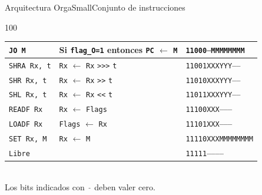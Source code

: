 \documentclass[aspectratio=169]{beamer}
\begin{document}
\begin{frame}[fragile,t]{Arquitectura OrgaSmall}{Conjunto de instrucciones}
\begin{textblock}{100}
\begin{tabular}{l|l|l}
    \texttt{JO M}          & Si \texttt{flag\_O=1} entonces \texttt{PC} $\leftarrow$ \texttt{M} & \texttt{\textcolor{r}{11000}\textcolor{gray}{---}\textcolor{a}{MMMMMMMM}} \\  %
    \hline
    \texttt{SHRA Rx, t}    & \texttt{Rx} $\leftarrow$ \texttt{Rx} \verb|>>>| \texttt{t}         & \texttt{\textcolor{r}{11001}\textcolor{v}{XXX}\textcolor{verde}{YYY}\textcolor{gray}{-----}} \\  %
    \texttt{SHR Rx, t}     & \texttt{Rx} $\leftarrow$ \texttt{Rx} \verb|>>| \texttt{t}          & \texttt{\textcolor{r}{11010}\textcolor{v}{XXX}\textcolor{verde}{YYY}\textcolor{gray}{-----}} \\  %
    \texttt{SHL Rx, t}     & \texttt{Rx} $\leftarrow$ \texttt{Rx} \verb|<<| \texttt{t}          & \texttt{\textcolor{r}{11011}\textcolor{v}{XXX}\textcolor{verde}{YYY}\textcolor{gray}{-----}} \\  %
    \hline
    \texttt{READF Rx}      & \texttt{Rx}    $\leftarrow$ \texttt{Flags}                         & \texttt{\textcolor{r}{11100}\textcolor{v}{XXX}\textcolor{gray}{--------}} \\  %
    \texttt{LOADF Rx}      & \texttt{Flags} $\leftarrow$ \texttt{Rx}                            & \texttt{\textcolor{r}{11101}\textcolor{v}{XXX}\textcolor{gray}{--------}} \\  %
    \hline
    \texttt{SET Rx, M}     & \texttt{Rx} $\leftarrow$ \texttt{M}                                & \texttt{\textcolor{r}{11110}\textcolor{v}{XXX}\textcolor{a}{MMMMMMMM}} \\  %
    \hline
    \texttt{Libre}         &                                                                    & \texttt{\textcolor{r}{11111}\textcolor{gray}{-----------}} \\  %
    \end{tabular}\\
    \vspace{0.2cm}
    Los bits indicados con \textcolor{gray}{\texttt{-}} deben valer cero.
    \end{textblock}
\end{frame}
\end{document}
